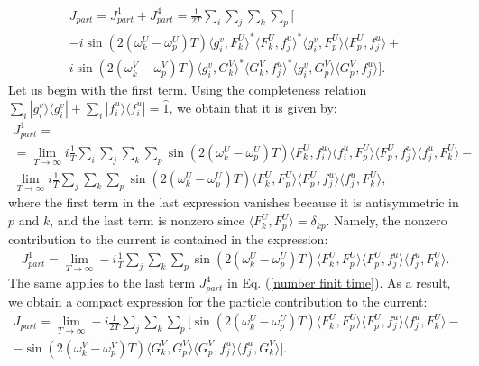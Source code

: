\documentclass[12pt]{article}
\numberwithin{equation}{section}
\begin{document}
\begin{gather}
    J_{part}=J_{part}^1 +J_{part}^4
=
     \frac{1}{2T} \sum_i \sum_j \sum_k \sum_p \Bigg[ \\ \nonumber  
   -i  \sin\left(2 (\omega^U_k - \omega^U_p) T\right)  \langle g^v_i, F^U_k \rangle^* \langle F^U_k, f^u_j \rangle^* \langle g^v_i, F^U_p \rangle \langle F^U_p, f^u_j \rangle
     + \\ \nonumber
     i\sin\left(2  (\omega^V_k - \omega^V_p) T\right) \langle g^v_i, G^V_k \rangle^* \langle G^V_k, f^u_j \rangle^* \langle g^v_i, G^V_p \rangle \langle G^V_p, f^u_j \rangle \Bigg].
\end{gather}
Let us begin with the first term. Using the completeness relation $\sum_i |g^v_i\rangle\langle g^v_i| + \sum_i |f^u_i\rangle\langle f^u_i| = \hat{1}$, we obtain that it is given by:
\begin{gather}
 J_{part}^1=\\=\nonumber\lim_{T\to \infty}  i \frac{1}{T} \sum_i \sum_j \sum_k \sum_p  
     \sin \left(2 (\omega^U_k - \omega^U_p) T \right) \langle F^U_k, f^u_i \rangle \langle f^u_i, F^U_p \rangle \langle F^U_p, f^u_j \rangle \langle f^u_j, F^U_k \rangle
     - \\ \nonumber 
 \lim_{T\to \infty}  i \frac{1}{T} \sum_j \sum_k \sum_p  
     \sin \left(2 (\omega^U_k - \omega^U_p) T \right) \langle F^U_k, F^U_p \rangle \langle F^U_p, f^u_j \rangle \langle f^u_j, F^U_k \rangle,
\end{gather}
where the first term in the last expression vanishes because it is antisymmetric in $p$ and $k$, and the last term is nonzero since $\langle F^U_k, F^U_p \rangle = \delta_{kp}$. Namely, the nonzero contribution to the current is contained in the expression:
\begin{gather}
J_{part}^1= \lim_{T\to \infty}  -i \frac{1}{T} \sum_j \sum_k \sum_p  
     \sin \left(2 (\omega^U_k - \omega^U_p) T \right) \langle F^U_k, F^U_p \rangle \langle F^U_p, f^u_j \rangle \langle f^u_j, F^U_k \rangle.
\end{gather}
The same applies to the last term $J_{part}^4$ in Eq. (\ref{number finit time}). As a result, we obtain a compact expression for the particle contribution to the current:
\begin{gather}
J_{part} = \lim_{T\to \infty}  -i \frac{1}{2T} \sum_j \sum_k \sum_p  
     \Bigg[  
     \sin \left(2 (\omega^U_k - \omega^U_p) T \right) \langle F^U_k, F^U_p \rangle \langle F^U_p, f^u_j \rangle \langle f^u_j, F^U_k \rangle
     - \\ \nonumber
     - \sin \left(2 (\omega^V_k - \omega^V_p) T \right) \langle G^V_k, G^V_p \rangle \langle G^V_p, f^u_j \rangle \langle f^u_j, G^V_k \rangle \Bigg].
\end{gather}
\end{document}
